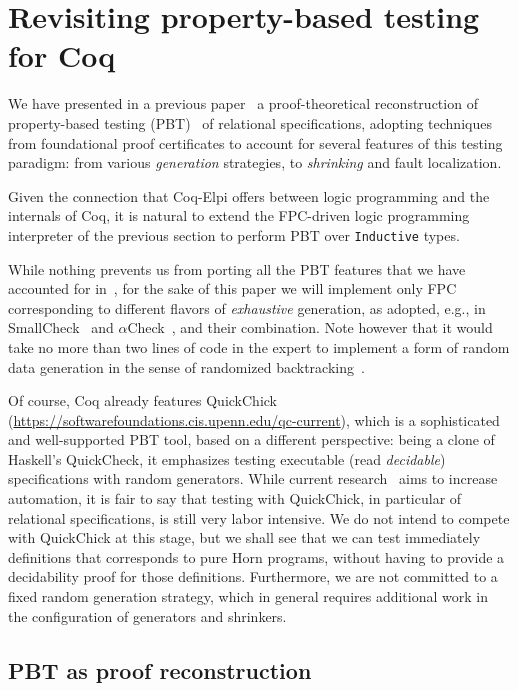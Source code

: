 \section{Revisiting property-based testing for Coq}

We have presented in a previous paper~\cite{blanco19ppdp} a
proof-theoretical reconstruction of property-based testing (PBT)~\cite{fink97sen}
of
relational specifications, adopting techniques from foundational proof
certificates to account for several features of this testing
paradigm: from various \emph{generation} strategies, to
\emph{shrinking} and fault localization.

Given the connection that Coq-Elpi offers between logic
programming and the internals of Coq, it is natural to extend the
FPC-driven logic programming interpreter of the previous section to
perform PBT over \lstinline{Inductive} types.

While nothing prevents us from porting all the PBT features that we have
accounted for in~\cite{blanco19ppdp}, for the sake of this paper we
will implement only FPC corresponding to different flavors of
\emph{exhaustive} generation, as adopted, e.g., in
SmallCheck~\cite{smallcheck} and
$\alpha$Check~\cite{cheney_momigliano_2017}, and their
combination. Note however that it would take  no more than two lines of
code in the  expert to implement a form of random data
generation in the sense of randomized
backtracking~\cite{pltredexconstraintlogic}.

Of course, Coq already features \textsf{QuickChick}~\cite{QChick}
(\url{https://softwarefoundations.cis.upenn.edu/qc-current}), which is
a sophisticated and well-supported PBT tool, based on a different
perspective: being a clone of Haskell's QuickCheck, it emphasizes
testing executable (read \emph{decidable}) specifications with random
generators. While current research~\cite{LampropoulosPP18} aims to
increase automation, it is fair to say that testing with
\textsf{QuickChick}, in particular of relational specifications, is
still very labor intensive. We do not intend to compete with
\textsf{QuickChick} at this stage, but we shall see that we can test immediately
 definitions that corresponds to pure Horn
programs, without having to provide a decidability
proof for those definitions. Furthermore, we are not committed to a
fixed random generation strategy, which in general requires additional
work in the configuration of generators and shrinkers.

\subsection{PBT as proof reconstruction}
\label{ssec:pbt-lp}


